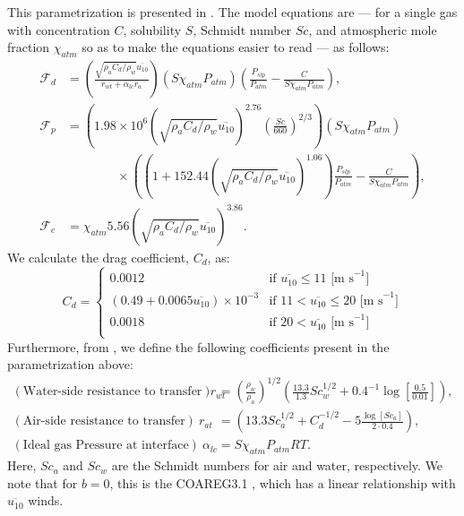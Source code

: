 \documentclass[11pt]{article}
\newcommand{\F}{\mathcal{F}}  %
\begin{document}
This parametrization is presented in \cite{liang2013}. 
The model equations are --- for a single gas with concentration $C$, solubility $S$, Schmidt number $Sc$, and atmospheric mole fraction $\chi_{atm}$ so as to make the equations easier to read --- as follows:
\begin{align}
	\F_d &= \left(\frac{\sqrt{\rho_a C_d / \rho_w} \overline{u_{10}}}{r_{wt} + \alpha_{lc} r_a}\right)\left(S\chi_{atm}P_{atm}\right)\left(\frac{P_{slp}}{P_{atm}} - \frac{C}{S\chi_{atm}P_{atm}}\right),\\
	\F_p &= \left(1.98\times 10^6 \left(\sqrt{\rho_a C_d / \rho_w} \overline{u_{10}}\right)^{2.76}\left(\frac{Sc}{660}\right)^{2 / 3}\right)\left(S\chi_{atm}P_{atm}\right) \\ &\quad\quad\quad\quad \times \left(\left(1 + 152.44 \left(\sqrt{\rho_a C_d / \rho_w} \overline{u_{10}}\right)^{1.06}\right)\frac{P_{slp}}{P_{atm}} - \frac{C}{S\chi_{atm}P_{atm}}\right),\\
	\F_c &= \chi_{atm}5.56\left(\sqrt{\rho_a C_d / \rho_w} \overline{u_{10}}\right)^{3.86}.
\end{align}
We calculate the drag coefficient, $C_d$, as:
\begin{equation}
	C_d = \begin{cases}
		0.0012 & \text{if } \overline{u_{10}} \le 11 \text{ [m s}^{-1}\text{]} \\
		\left(0.49 + 0.0065\overline{u_{10}}\right)\times 10^{-3} & \text{if } 11 < \overline{u_{10}} \le 20 \text{ [m s}^{-1}\text{]} \\
		0.0018 & \text{if } 20 < \overline{u_{10}} \text{ [m s}^{-1}\text{]} \\
	      \end{cases}	
\end{equation}
Furthermore, from \cite{fairall2011}, we define the following coefficients present in the parametrization above:
\begin{align}
	\left(\text{Water-side resistance to transfer}\right) \: r_{wt} &= \left( \frac{\rho_w}{\rho_a}\right)^{1 / 2}\left(\frac{13.3}{1.3} Sc_w^{1 / 2} + 0.4^{-1}\log\left[\frac{0.5}{0.01}\right]\right), \\
	\left(\text{Air-side resistance to transfer}\right) \: r_{at} &= \left(13.3Sc_a^{1 / 2} + C_d^{-1 / 2} - 5 \frac{\log\left[Sc_a\right]}{2\cdot 0.4}\right), \\
	\left(\text{Ideal gas Pressure at interface}\right)\: \alpha_{lc} &= S\chi_{atm}P_{atm}RT.
\end{align} 
Here, $Sc_a$ and  $Sc_w$ are the Schmidt numbers for air and water, respectively.
We note that for $b=0$, this is the COAREG3.1 \cite{fairall2011}, which has a linear relationship with $\overline{u_{10}}$ winds.
\end{document}
